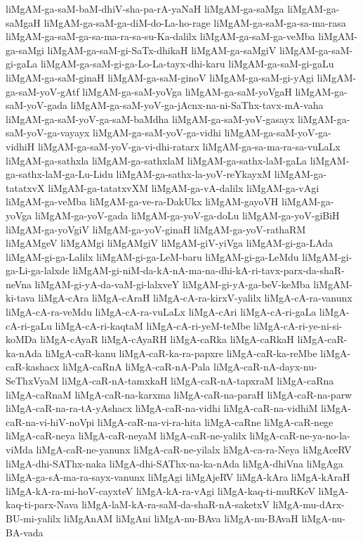 {liMgAM-ga-saM-baM-dhiV-sha-pa-rA-yaNaH
liMgAM-ga-saMga
liMgAM-ga-saMgaH
liMgAM-ga-saM-ga-diM-do-La-ho-rage
liMgAM-ga-saM-ga-sa-ma-rasa
liMgAM-ga-saM-ga-sa-ma-ra-sa-su-Ka-dalilx
liMgAM-ga-saM-ga-veMba
liMgAM-ga-saMgi
liMgAM-ga-saM-gi-SaTx-dhikaH
liMgAM-ga-saMgiV
liMgAM-ga-saM-gi-gaLa
liMgAM-ga-saM-gi-ga-Lo-La-tayx-dhi-karu
liMgAM-ga-saM-gi-gaLu
liMgAM-ga-saM-ginaH
liMgAM-ga-saM-ginoV
liMgAM-ga-saM-gi-yAgi
liMgAM-ga-saM-yoV-gAtf
liMgAM-ga-saM-yoVga
liMgAM-ga-saM-yoVgaH
liMgAM-ga-saM-yoV-gada
liMgAM-ga-saM-yoV-ga-jAcnx-na-ni-SaThx-tavx-mA-vaha
liMgAM-ga-saM-yoV-ga-saM-baMdha
liMgAM-ga-saM-yoV-gasayx
liMgAM-ga-saM-yoV-ga-vayayx
liMgAM-ga-saM-yoV-ga-vidhi
liMgAM-ga-saM-yoV-ga-vidhiH
liMgAM-ga-saM-yoV-ga-vi-dhi-ratarx
liMgAM-ga-sa-ma-ra-sa-vuLaLx
liMgAM-ga-sathxla
liMgAM-ga-sathxlaM
liMgAM-ga-sathx-laM-gaLa
liMgAM-ga-sathx-laM-ga-Lu-Lidu
liMgAM-ga-sathx-la-yoV-reYkayxM
liMgAM-ga-tatatxvX
liMgAM-ga-tatatxvXM
liMgAM-ga-vA-dalilx
liMgAM-ga-vAgi
liMgAM-ga-veMba
liMgAM-ga-ve-ra-DakUkx
liMgAM-gayoVH
liMgAM-ga-yoVga
liMgAM-ga-yoV-gada
liMgAM-ga-yoV-ga-doLu
liMgAM-ga-yoV-giBiH
liMgAM-ga-yoVgiV
liMgAM-ga-yoV-ginaH
liMgAM-ga-yoV-rathaRM
liMgAMgeV
liMgAMgi
liMgAMgiV
liMgAM-giV-yiVga
liMgAM-gi-ga-LAda
liMgAM-gi-ga-Lalilx
liMgAM-gi-ga-LeM-baru
liMgAM-gi-ga-LeMdu
liMgAM-gi-ga-Li-ga-lalxde
liMgAM-gi-niM-da-kA-nA-ma-na-dhi-kA-ri-tavx-parx-da-shaR-neVna
liMgAM-gi-yA-da-vaM-gi-lalxveY
liMgAM-gi-yA-ga-beV-keMba
liMgAM-ki-tava
liMgA-cAra
liMgA-cAraH
liMgA-cA-ra-kirxV-yalilx
liMgA-cA-ra-vanunx
liMgA-cA-ra-veMdu
liMgA-cA-ra-vuLaLx
liMgA-cAri
liMgA-cA-ri-gaLa
liMgA-cA-ri-gaLu
liMgA-cA-ri-kaqtaM
liMgA-cA-ri-yeM-teMbe
liMgA-cA-ri-ye-ni-si-koMDa
liMgA-cAyaR
liMgA-cAyaRH
liMgA-caRka
liMgA-caRkaH
liMgA-caR-ka-nAda
liMgA-caR-kanu
liMgA-caR-ka-ra-papxre
liMgA-caR-ka-reMbe
liMgA-caR-kashacx
liMgA-caRnA
liMgA-caR-nA-Pala
liMgA-caR-nA-dayx-nu-SeThxVyaM
liMgA-caR-nA-tamxkaH
liMgA-caR-nA-tapxraM
liMgA-caRna
liMgA-caRnaM
liMgA-caR-na-karxma
liMgA-caR-na-paraH
liMgA-caR-na-parw
liMgA-caR-na-ra-tA-yAshacx
liMgA-caR-na-vidhi
liMgA-caR-na-vidhiM
liMgA-caR-na-vi-hiV-noVpi
liMgA-caR-na-vi-ra-hita
liMgA-caRne
liMgA-caR-nege
liMgA-caR-neya
liMgA-caR-neyaM
liMgA-caR-ne-yalilx
liMgA-caR-ne-ya-no-la-viMda
liMgA-caR-ne-yanunx
liMgA-caR-ne-yilalx
liMgA-ca-ra-Neya
liMgAceRV
liMgA-dhi-SAThx-naka
liMgA-dhi-SAThx-na-ka-nAda
liMgA-dhiVna
liMgAga
liMgA-ga-sA-ma-ra-sayx-vanunx
liMgAgi
liMgAjeRV
liMgA-kAra
liMgA-kAraH
liMgA-kA-ra-mi-hoV-cayxteV
liMgA-kA-ra-vAgi
liMgA-kaq-ti-muRKeV
liMgA-kaq-ti-parx-Nava
liMgA-laM-kA-ra-saM-da-shaR-nA-saketxV
liMgA-mu-dArx-BU-mi-yalilx
liMgAnAM
liMgAni
liMgA-nu-BAva
liMgA-nu-BAvaH
liMgA-nu-BA-vada
}
